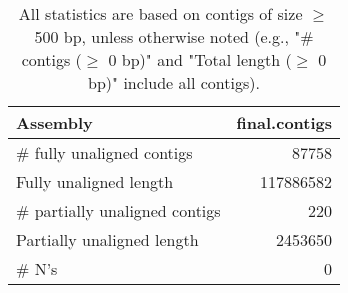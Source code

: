 \documentclass[12pt,a4paper]{article}
\begin{document}
\begin{table}[ht]
\begin{center}
\caption{All statistics are based on contigs of size $\geq$ 500 bp, unless otherwise noted (e.g., "\# contigs ($\geq$ 0 bp)" and "Total length ($\geq$ 0 bp)" include all contigs).}
\begin{tabular}{|l*{1}{|r}|}
\hline
Assembly & final.contigs \\ \hline
\# fully unaligned contigs & 87758 \\ \hline
Fully unaligned length & 117886582 \\ \hline
\# partially unaligned contigs & 220 \\ \hline
Partially unaligned length & 2453650 \\ \hline
\# N's & 0 \\ \hline
\end{tabular}
\end{center}
\end{table}
\end{document}
